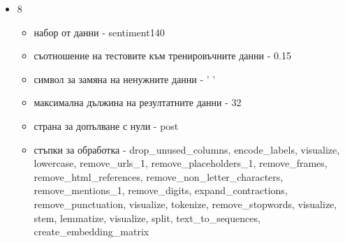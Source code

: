\documentclass{article}
\begin{document}
\begin{itemize}
  \item 8

  \begin{itemize}
    \item набор от данни - sentiment140
    \item съотношение на тестовите към тренировъчните данни - 0.15
    \item символ за замяна на ненужните данни - ' '
    \item максимална дължина на резултатните данни - 32
    \item страна за допълване с нули - post
    \item стъпки за обработка - drop\_unused\_columns, encode\_labels, visualize, lowercase, remove\_urls\_1,
    remove\_placeholders\_1, remove\_frames, remove\_html\_references, remove\_non\_letter\_characters,
    remove\_mentions\_1, remove\_digits, expand\_contractions, remove\_punctuation, visualize, tokenize,
    remove\_stopwords, visualize, stem, lemmatize, visualize, split, text\_to\_sequences, create\_embedding\_matrix
  \end{itemize}


\end{itemize}
\end{document}
